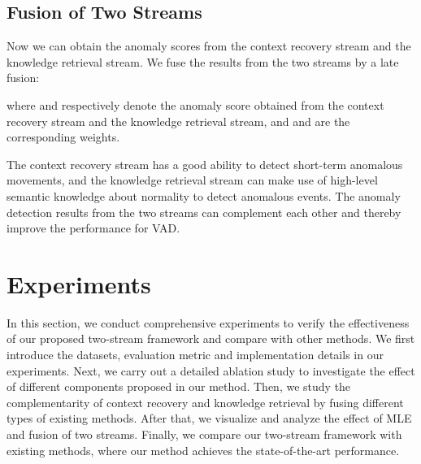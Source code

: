 \documentclass[lettersize,journal]{IEEEtran}
\begin{document}
\subsection{Fusion of Two Streams}
Now we can obtain the anomaly scores from the context recovery stream and the knowledge retrieval stream.
We fuse the results from the two streams by a late fusion:

where  and  respectively denote the anomaly score obtained from the context recovery stream and the knowledge retrieval stream, and  and  are the corresponding weights.

The context recovery stream has a good ability to detect short-term anomalous movements, and the knowledge retrieval stream can make use of high-level semantic knowledge about normality to detect anomalous events.
The anomaly detection results from the two streams can complement each other and thereby improve the performance for VAD.


\section{Experiments}
In this section, we conduct comprehensive experiments to verify the effectiveness of our proposed two-stream framework and compare with other methods.
We first introduce the datasets, evaluation metric and implementation details in our experiments.
Next, we carry out a detailed ablation study to investigate the effect of different components proposed in our method.
Then, we study the complementarity of context recovery and knowledge retrieval by fusing different types of existing methods.
After that, we visualize and analyze the effect of MLE and fusion of two streams.
Finally, we compare our two-stream framework with existing methods, where our method achieves the state-of-the-art performance.
\end{document}
